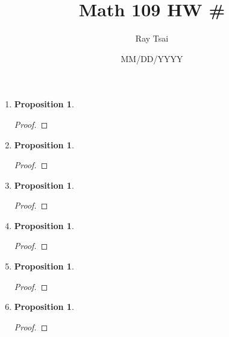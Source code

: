 \documentclass{article}
\title{Math 109 HW #}
\author{Ray Tsai}
\date{MM/DD/YYYY}
\newtheorem{prop}[thm]{Proposition}
\begin{document}
 

\maketitle 

\begin{enumerate}
\item 
\begin{prop}
    
\end{prop}
\begin{proof}

\end{proof}

\item 
\begin{prop}

\end{prop}
\begin{proof}

\end{proof}

\item \begin{prop}

\end{prop}
\begin{proof}

\end{proof}

\item 
\begin{prop}
     
\end{prop}
\begin{proof}
    
\end{proof}

\item 
\begin{prop}
   
\end{prop}
\begin{proof}

\end{proof}

\item 
\begin{prop}
    
\end{prop}
\begin{proof}


\end{proof}
\end{enumerate}
\end{document}
